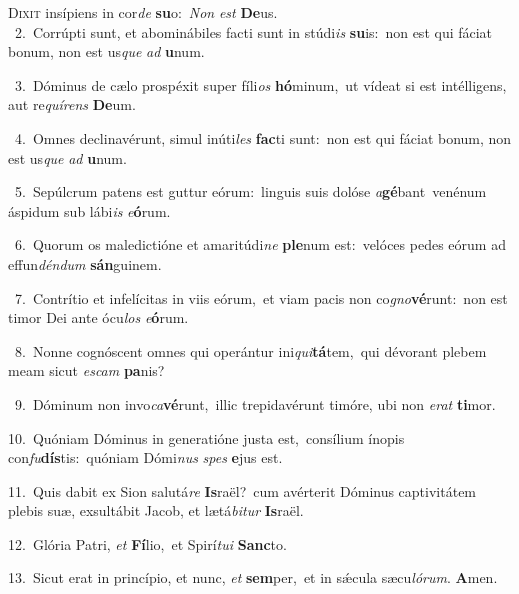 \lettrine{\initial\textcolor{\initialcolor}{D}}{ixit} insípiens in cor\textit{de} \textbf{su}\-o:~\star \textit{Non} \textit{est} \textbf{De}\-us.\\
{\numbfont\textcolor{\numbcolor}{~2.}}~Corrúpti sunt, et abominábiles facti sunt in stúdi\textit{is} \textbf{su}\-is:~\star non est qui fáciat bonum, non est us\textit{que} \textit{ad} \textbf{u}\-num.\par
{\numbfont\textcolor{\numbcolor}{~3.}}~Dóminus de cælo prospéxit super fíli\textit{os} \textbf{hó}\-minum,~\star ut vídeat si est intélligens, aut re\-\textit{quí}\-\textit{rens} \textbf{De}\-um.\par
{\numbfont\textcolor{\numbcolor}{~4.}}~Omnes declinavérunt, simul inúti\textit{les} \textbf{fac}\-ti sunt:~\star non est qui fáciat bonum, non est us\textit{que} \textit{ad} \textbf{u}\-num.\par
{\numbfont\textcolor{\numbcolor}{~5.}}~Sepúlcrum patens est guttur eórum:~\dagger linguis suis dolóse \textit{a}\-\textbf{gé}bant~\star venénum áspidum sub lábi\textit{is} \textit{e}\-\textbf{ó}rum.\par
{\numbfont\textcolor{\numbcolor}{~6.}}~Quorum os maledictióne et amaritúdi\textit{ne} \textbf{ple}\-num est:~\star velóces pedes eórum ad effun\-\textit{dén}\-\textit{dum} \textbf{sán}\-guinem.\par
{\numbfont\textcolor{\numbcolor}{~7.}}~Contrítio et infelícitas in viis eórum,~\dagger et viam pacis non co\-\textit{gno}\-\textbf{vé}runt:~\star non est timor Dei ante ócu\textit{los} \textit{e}\-\textbf{ó}rum.\par
{\numbfont\textcolor{\numbcolor}{~8.}}~Nonne cognóscent omnes qui operántur ini\-\textit{qui}\-\textbf{tá}tem,~\star qui dévorant plebem meam sicut \textit{es}\-\textit{cam} \textbf{pa}\-nis?\par
{\numbfont\textcolor{\numbcolor}{~9.}}~Dóminum non invo\-\textit{ca}\-\textbf{vé}runt,~\star illic trepidavérunt timóre, ubi non \textit{e}\-\textit{rat} \textbf{ti}\-mor.\par
{\numbfont\textcolor{\numbcolor}{10.}}~Quóniam Dóminus in generatióne justa est,~\dagger consílium ínopis con\-\textit{fu}\-\textbf{dís}tis:~\star quóniam Dómi\textit{nus} \textit{spes} \textbf{e}\-jus est.\par
{\numbfont\textcolor{\numbcolor}{11.}}~Quis dabit ex Sion salutá\textit{re} \textbf{Is}\-raël?~\star cum avérterit Dóminus captivitátem plebis suæ, exsultábit Jacob, et lætá\-\textit{bi}\-\textit{tur} \textbf{Is}\-raël.\par
{\numbfont\textcolor{\numbcolor}{12.}}~Glória Patri, \textit{et} \textbf{Fí}\-lio,~\star et Spirí\-\textit{tu}\-\textit{i} \textbf{Sanc}\-to.\par
{\numbfont\textcolor{\numbcolor}{13.}}~Sicut erat in princípio, et nunc, \textit{et} \textbf{sem}\-per,~\star et in sǽcula sæcu\-\textit{ló}\-\textit{rum}. \textbf{A}\-men.\par
